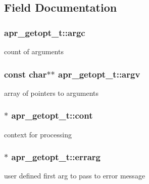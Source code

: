 \subsection{Field Documentation}
\subsubsection[{\texorpdfstring{argc}{argc}}]{ apr\+\_\+getopt\+\_\+t\+::argc}\hypertarget{structapr__getopt__t_a58aeb33137aabdd5a00efbde05652094}{}\label{structapr__getopt__t_a58aeb33137aabdd5a00efbde05652094}
count of arguments 
\subsubsection[{\texorpdfstring{argv}{argv}}]{\setlength{\rightskip}{0pt plus 5cm}const char$\ast$$\ast$ apr\+\_\+getopt\+\_\+t\+::argv}\hypertarget{structapr__getopt__t_a296c27d8db2fe6d4b88c5c7a85c40c02}{}\label{structapr__getopt__t_a296c27d8db2fe6d4b88c5c7a85c40c02}
array of pointers to arguments 
\subsubsection[{\texorpdfstring{cont}{cont}}]{$\ast$ apr\+\_\+getopt\+\_\+t\+::cont}\hypertarget{structapr__getopt__t_a63a073fb9c11bb2713b3d7f967e95a24}{}\label{structapr__getopt__t_a63a073fb9c11bb2713b3d7f967e95a24}
context for processing 
\subsubsection[{\texorpdfstring{errarg}{errarg}}]{$\ast$ apr\+\_\+getopt\+\_\+t\+::errarg}\hypertarget{structapr__getopt__t_a46db55c58789ab7fa99bb49544b0776e}{}\label{structapr__getopt__t_a46db55c58789ab7fa99bb49544b0776e}
user defined first arg to pass to error message 
